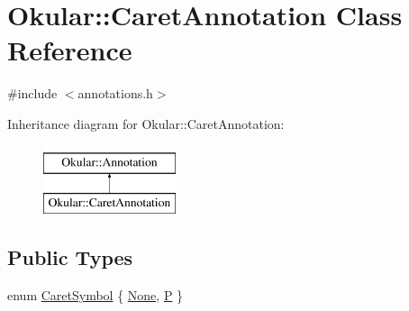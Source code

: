 \hypertarget{classOkular_1_1CaretAnnotation}{\section{Okular\+:\+:Caret\+Annotation Class Reference}
\label{classOkular_1_1CaretAnnotation}
}


{\ttfamily \#include $<$annotations.\+h$>$}

Inheritance diagram for Okular\+:\+:Caret\+Annotation\+:\begin{figure}[H]
\begin{center}
\leavevmode
\includegraphics[height=2.000000cm]{classOkular_1_1CaretAnnotation}
\end{center}
\end{figure}
\subsection*{Public Types}
\begin{DoxyCompactItemize}
\item 
enum \hyperlink{classOkular_1_1CaretAnnotation_a0fa75d6ac84d6e08aae0561b55e98695}{Caret\+Symbol} \{ \hyperlink{classOkular_1_1CaretAnnotation_a0fa75d6ac84d6e08aae0561b55e98695aac987216c2d46c031053ac96718c05ee}{None}, 
\hyperlink{classOkular_1_1CaretAnnotation_a0fa75d6ac84d6e08aae0561b55e98695a18d3f68c9167d4db0fd70b5d869c813a}{P}
 \}
\end{DoxyCompactItemize}
